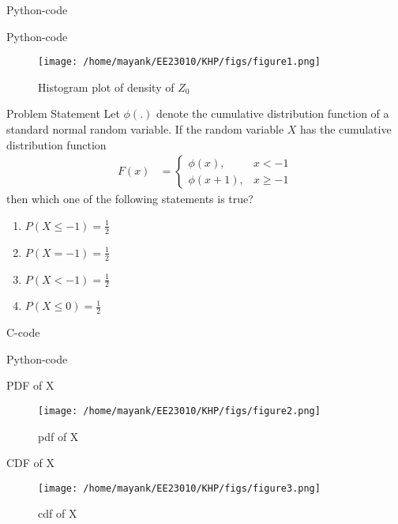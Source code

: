 \documentclass{beamer}
\begin{document}
\begin{frame}{Python-code}
  
\end{frame}

\begin{frame}{Python-code}
\begin{figure}
  \centering
  \texttt{[image: /home/mayank/EE23010/KHP/figs/figure1.png]}  %
  \caption{Histogram plot of density of $Z_0$}
  \label{fig:your_label}
\end{figure}
\end{frame}

\begin{frame}{Problem Statement}
  Let $\phi(.)$ denote the cumulative distribution function of a standard normal
random variable. If the random variable $X$ has the cumulative distribution
function 
\begin{align}
	F(x)&= 
    \begin{cases}
        \phi(x), &  x < -1 \\
        \phi(x+1) , &  x \ge -1
    \end{cases} \label{eq:15st/2023}
\end{align}
then which one of the following statements is true?
\begin{enumerate}
\item $P(X \leq -1) = \frac{1}{2}$
\item $P(X = -1) = \frac{1}{2}$
\item $P(X < -1) = \frac{1}{2}$
\item $P(X \leq 0) = \frac{1}{2}$
\end{enumerate}
\end{frame}

\begin{frame}[allowframebreaks]{C-code}
  
\end{frame}

\begin{frame}[allowframebreaks]{Python-code}
  
\end{frame}

\begin{frame}{PDF of X}
\begin{figure}
  \centering
  \texttt{[image: /home/mayank/EE23010/KHP/figs/figure2.png]}  %
  \caption{pdf of X}
  \label{fig:your_label}
\end{figure}
\end{frame}

\begin{frame}{CDF of X}
\begin{figure}
  \centering
  \texttt{[image: /home/mayank/EE23010/KHP/figs/figure3.png]}  %
  \caption{cdf of X}
  \label{fig:your_label}
\end{figure}
\end{frame}
\end{document}
